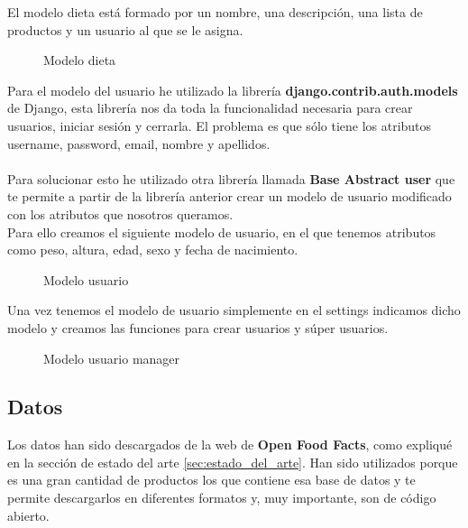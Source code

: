 El modelo dieta está formado por un nombre, una descripción, una lista de productos y un usuario al que se le asigna.\\

\begin{figure}[H]
  \centering
  \noindent{}
  \caption{Modelo dieta}
\end{figure}

Para el modelo del usuario he utilizado la librería \textbf{django.contrib.auth.models} de Django, 
esta librería nos da toda la funcionalidad necesaria para crear usuarios, iniciar sesión y cerrarla. 
El problema es que sólo tiene los atributos username, password, email, nombre y apellidos.\\\\

Para solucionar esto he utilizado otra librería llamada \textbf{Base Abstract user} que te permite a partir 
de la librería anterior crear un modelo de usuario modificado con los atributos que nosotros queramos.\\

Para ello creamos el siguiente modelo de usuario, en el que tenemos atributos como peso, altura, edad, sexo y fecha de nacimiento.

\begin{figure}[H]
  \centering
  \noindent{}
  \caption{Modelo usuario}
\end{figure}

Una vez tenemos el modelo de usuario simplemente en el settings indicamos dicho modelo y creamos las funciones 
para crear usuarios y súper usuarios.\\

\begin{figure}[H]
  \centering
  \noindent{}
  \caption{Modelo usuario manager}
\end{figure}

\subsection{Datos}

Los datos han sido descargados de la web de \textbf{Open Food Facts}, como expliqué en la sección de estado del arte \ref{sec:estado_del_arte}.
Han sido utilizados porque es una gran cantidad de productos los que contiene esa base de datos y te permite descargarlos en diferentes formatos y, muy importante,
son de código abierto.\\ \\

